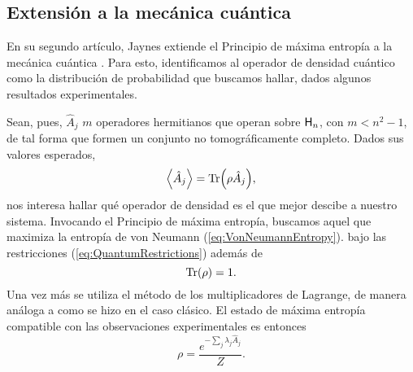 \subsection{Extensión a la mecánica cuántica}

En su segundo artículo, Jaynes extiende el Principio de máxima entropía a la mecánica cuántica \cite{JaynesII}. Para esto, identificamos al operador de densidad cuántico como la distribución de probabilidad que buscamos hallar, dados algunos resultados experimentales.

Sean, pues, $\hat{A}_{j}$ $m$ operadores hermitianos que operan sobre ${\sf H}_{n}$, con $m<n^{2}-1$, de tal forma que formen un conjunto no tomográficamente completo. Dados sus valores esperados,
\begin{equation}\label{eq:QuantumRestrictions}
    \expval{\hat{A}_{j}}=\Tr(\rho \hat{A}_{j}),
\end{equation} 
nos interesa hallar qué operador de densidad es el que mejor descibe a nuestro sistema. Invocando el Principio de máxima entropía, buscamos aquel que maximiza la entropía de von Neumann (\ref{eq:VonNeumannEntropy}). bajo las restricciones (\ref{eq:QuantumRestrictions}) además de
\begin{equation}\label{eq:TraceRestriction}
    \Tr(\rho)=1.
\end{equation}
Una vez más se utiliza el método de los multiplicadores de Lagrange, de manera análoga a como se hizo en el caso clásico. El estado de máxima entropía compatible con las observaciones experimentales es entonces
\begin{equation*}
    \rho=\frac{e^{-\sum_{j} \lambda_{j} \hat{A}_{j}}}{Z}.
\end{equation*}
